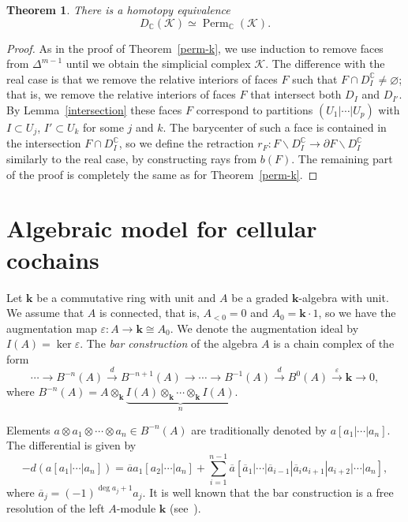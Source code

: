 \documentclass[a4paper,12pt]{amsart}
\newcommand{\K}{\mathcal K}
\newcommand{\CC}{\mathbb C}
\newcommand{\kk}{\mathbf{k}}
\newtheorem{theorem}[formula]{Theorem}
\theoremstyle{definition}
\theoremstyle{remark}
\numberwithin{equation}{section}
\DeclareMathOperator{\Perm}{Perm}
\begin{document}
\begin{theorem}
There is a homotopy equivalence
$$D_\CC(\K) \simeq \Perm_\CC(\K).$$
\end{theorem}
\begin{proof}
As in the proof of Theorem~\ref{perm-k}, we use induction to remove faces from $\Delta^{m-1}$ until we obtain the simplicial complex $\K$.
The difference with the real case is that we remove the relative interiors of faces $F$ such that $F \cap D^\CC_I \neq \varnothing$; that is,
we remove the relative interiors of faces $F$ that intersect both $D_I$ and $D_{I'}$. 
By Lemma~\ref{intersection} these faces $F$ correspond to partitions
$(U_1| \cdots | U_p)$ with $I \subset U_j$, $I' \subset U_k$ for some $j$ and $k$.
The barycenter of such a face is contained in the intersection $F \cap D^\CC_I$,
so we define the retraction $r_F \colon F \backslash D^\CC_I \to \partial F \backslash D^\CC_I$ similarly to the real case, by constructing rays from $b(F)$.
The remaining part of the proof is completely the same as for Theorem~\ref{perm-k}.
\end{proof}



\section{Algebraic model for cellular cochains}
Let $\kk$ be a commutative ring with unit and $A$ be a graded $\kk$-algebra with unit.
We assume that $A$ is connected, that is, $A_{<0}=0$ and $A_0 = \kk \cdot 1$, so we have the augmentation map $\varepsilon \colon A \to \kk \cong A_0$.
We denote the augmentation ideal by $I(A) = \ker \varepsilon$. 
The \textit{bar construction} of the algebra $A$ is a chain complex of the form
\[
  \cdots \to B^{-n}(A) \stackrel{d}\to B^{-n+1}(A) \to \cdots \to B^{-1}(A) \stackrel{d}\to B^0(A) \stackrel{\varepsilon}\to \kk \to 0,
\]  
where $B^{-n}(A) = A \otimes_{\kk} \underbrace{I(A) \otimes_{\kk} \cdots \otimes_{\kk} I(A)}_n$.

Elements $a \otimes a_1 \otimes \cdots \otimes a_n \in B^{-n}(A)$ are traditionally denoted by $a[a_1 | \cdots | a_n]$.
The differential is given by
$$-d(a[a_1 | \cdots | a_n]) = \overline{a} a_1 [a_2 | \cdots | a_n] + \sum_{i = 1}^{n-1} \overline{a}[\overline{a}_1 | \cdots | \overline{a}_{i-1} |
\overline{a}_i a_{i+1} | a_{i+2} | \cdots | a_n],$$
where $\overline{a}_j = (-1)^{\deg a_j + 1}a_j$. 
It is well known that the bar construction is a free resolution of the left $A$-module $\kk$ (see~\cite[Chapter~X]{Mac}).
\end{document}
